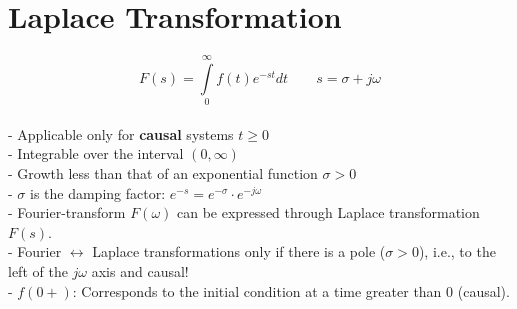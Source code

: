 \section{Laplace Transformation}
	$$\boxed{F(s)=\int\limits_0^\infty f(t)e^{-st}dt} \qquad s=\sigma +j\omega$$\\
	- Applicable only for \textbf{causal} systems $\boxed{t\geq 0}$\\
	- Integrable over the interval $(0,\infty)$\\
	- Growth less than that of an exponential function $\boxed{\sigma > 0}$\\
	- $\sigma$ is the damping factor: $e^{-s}=e^{-\sigma} \cdot e^{-j\omega}$ \\
	- Fourier-transform $F(\omega)$ can be expressed through Laplace transformation $F(s)$.  \\
	- Fourier $\longleftrightarrow$ Laplace transformations only if there is a pole ($\sigma > 0$), i.e.,
		to the left of the $j\omega$ axis and causal!\\
	- $f(0+)$: Corresponds to the initial condition at a time greater than 0 (causal).

